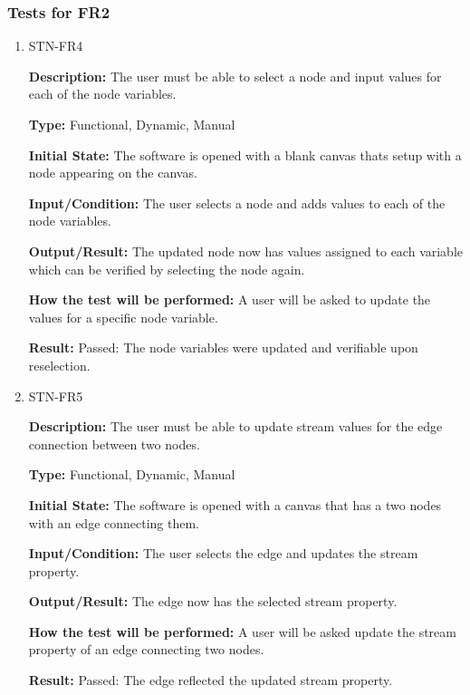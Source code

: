 \documentclass[12pt, titlepage]{article}
\begin{document}
\subsubsection{Tests for FR2}
\begin{enumerate}

\item{STN-FR4\\}

\textbf{Description:} The user must be able to select a node and input values for each of the node variables.

\textbf{Type:} Functional, Dynamic, Manual

\textbf{Initial State:} The software is opened with a blank canvas thats setup with a node appearing on the canvas.

\textbf{Input/Condition:} The user selects a node and adds values to each of the node variables.

\textbf{Output/Result:} The updated node now has values assigned to each variable which can be verified by selecting the node again.

\textbf{How the test will be performed:} A user will be asked to update the values for a specific node variable.

\textbf{Result:} Passed: The node variables were updated and verifiable upon reselection.

\item{STN-FR5\\}

\textbf{Description:} The user must be able to update stream values for the edge connection between two nodes.

\textbf{Type:} Functional, Dynamic, Manual

\textbf{Initial State:} The software is opened with a canvas that has a two nodes with an edge connecting them.

\textbf{Input/Condition:} The user selects the edge and updates the stream property.

\textbf{Output/Result:} The edge now has the selected stream property.

\textbf{How the test will be performed:} A user will be asked update the stream property of an edge connecting two nodes.

\textbf{Result:} Passed: The edge reflected the updated stream property.

\end{enumerate}
\end{document}
